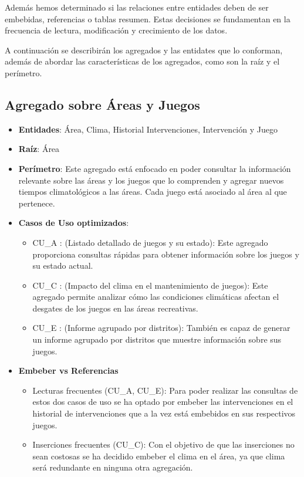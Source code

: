 \documentclass[]{article}
\begin{document}
Además hemos determinado si las relaciones entre entidades deben de ser embebidas, referencias o tablas resumen. Estas decisiones se fundamentan en la frecuencia de lectura, modificación y crecimiento de los datos.

A continuación se describirán los agregados y las entidates que lo conforman, además de abordar las características de los agregados, como son la raíz y el perímetro.

\subsection{Agregado sobre Áreas y Juegos}
\label{sub_sec:agregado_area_juego}
\begin{itemize}
    \item \textbf{Entidades}: Área, Clima, Historial Intervenciones, Intervención y Juego
    \item \textbf{Raíz}: Área
    \item \textbf{Perímetro}: Este agregado está enfocado en poder consultar la información relevante sobre las áreas y los juegos que lo comprenden y agregar nuevos tiempos climatológicos a las áreas. Cada juego está asociado al área al que pertenece.
    \item \textbf{Casos de Uso optimizados}:
    \begin{itemize}
        \item CU\_A : (Listado detallado de juegos y su estado): Este agregado proporciona consultas rápidas para obtener información sobre los juegos y su estado actual. 
        \item CU\_C : (Impacto del clima en el mantenimiento de juegos): Este agregado permite analizar cómo las condiciones climáticas afectan el desgates de los juegos en las áreas recreativas.
        \item CU\_E : (Informe agrupado por distritos): También es capaz de generar un informe agrupado por distritos que muestre información sobre sus juegos. 
    \end{itemize}
    \item \textbf{Embeber vs Referencias}
    \begin{itemize}
        \item Lecturas frecuentes (CU\_A, CU\_E): Para poder realizar las consultas de estos dos casos de uso se ha optado por embeber las intervenciones en el historial de intervenciones que a la vez está embebidos en sus respectivos juegos.
        \item Inserciones frecuentes (CU\_C): Con el objetivo de que las inserciones no sean costosas se ha decidido embeber el clima en el área, ya que clima será redundante en ninguna otra agregación.

\end{itemize}
\end{itemize}
\end{document}
